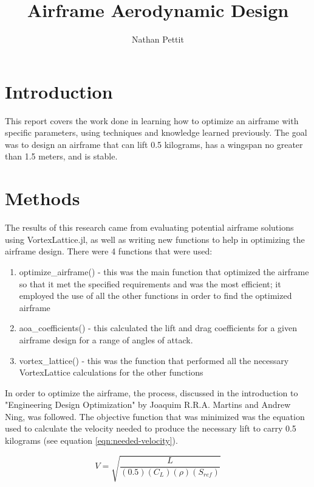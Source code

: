 \documentclass{journal}
\title{Airframe Aerodynamic Design}
\author{Nathan Pettit}
\begin{document}
	
	\maketitle	
	
	\section{Introduction}
	
	This report covers the work done in learning how to optimize an airframe with specific parameters, using techniques and knowledge learned previously. The goal was to design an airframe that can lift 0.5 kilograms, has a wingspan no greater than 1.5 meters, and is stable.
	
	\section{Methods}
	The results of this research came from evaluating potential airframe solutions using VortexLattice.jl, as well as writing new functions to help in optimizing the airframe design. There were 4 functions that were  used:
	
	\begin{enumerate}
		\item optimize\_airframe() - this was the main function that optimized the airframe so that it met the specified requirements and was the most efficient; it employed the use of all the other functions in order to find the optimized airframe
		\item aoa\_coefficients() - this calculated the lift and drag coefficients for a given airframe design for a range of angles of attack.
		\item vortex\_lattice() - this was the function that performed all the necessary VortexLattice calculations for the other functions 
	\end{enumerate}

	In order to optimize the airframe, the process, discussed in the introduction to "Engineering Design Optimization" by Joaquim R.R.A. Martins and Andrew Ning, was followed. The objective function  that was minimized was the equation used to calculate the velocity needed to produce the necessary lift to carry 0.5 kilograms (see equation \ref{eqn:needed-velocity}).
	
	\begin{equation}
		V = \sqrt{\frac{L}{(0.5)(C_L)(\rho)(S_{ref})}}
		\label{eqn:needed-velocity}
	\end{equation}
\end{document}
